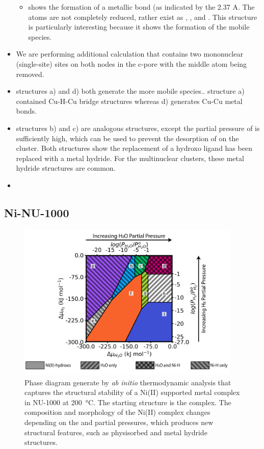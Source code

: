 \documentclass[journal=jctcce,manuscript=article]{achemso}
\begin{document}
\begin{itemize}
\begin{itemize}
        \item {} shows the formation of a metallic  bond (as indicated by the 2.37 A. The  atoms are not completely reduced, rather exist as , , and . This structure is particularly interesting because it shows the formation of the mobile  species. 
    \end{itemize}
    \item We are performing additional calculation that contains two mononuclear (single-site)  sites on both nodes in the c-pore with the middle  atom being removed. 
\end{itemize}

\begin{itemize}
    \item structures a) and d) both generate the more mobile species.. structure a) contained Cu-H-Cu bridge structures whereas d) generates Cu-Cu metal bonds.
    \item structures b) and c) are analogous structures, except the partial pressure of  is sufficiently high, which can be used to prevent the desorption of  on the cluster. Both structures show the replacement of a hydroxo ligand has been replaced with a metal hydride. For the multinuclear clusters, these metal hydride structures are common. 
    \item 
\end{itemize}
 
\newpage
\subsection{Ni-NU-1000}
\begin{figure}[H]
    \centering
    \includegraphics[width=0.95\textwidth]{zi-images/01-Ni-Graphics/2020-08-31-Phase-Diagram-V02.png}
    \caption{Phase diagram generate by \textit{ab initio} thermodynamic analysis that captures the structural stability of a Ni(II) supported metal complex in NU-1000 at \SI{200}{\celsius}. The starting structure is the  complex. The composition and morphology of the Ni(II) complex changes depending on the  and  partial pressures, which produces new structural features, such as physisorbed  and metal hydride structures.}
    \label{fig:phasediagramNi4}
\end{figure}
\end{document}
